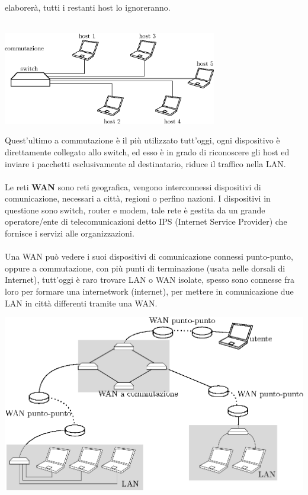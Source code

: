 \documentclass[12pt, letterpaper]{article}
\newcommand{\acc}{\\\hphantom{}\\}
\begin{document}
elaborerà, tutti i restanti host lo ignoreranno.\acc \begin{center}
    \includegraphics[width=0.7\textwidth ]{images/commutazione.eps}
\end{center}
Quest'ultimo a commutazione è il più utilizzato tutt'oggi, ogni dispositivo è direttamente collegato allo switch, ed esso è 
in grado di riconoscere gli host ed inviare i pacchetti esclusivamente al destinatario, riduce il traffico nella LAN.\acc 
Le reti \textbf{WAN} sono reti geografica, vengono interconnessi dispositivi di comunicazione, necessari a città, regioni o 
perfino nazioni. I dispositivi in questione sono switch, router e modem, tale rete è gestita da un grande operatore/ente di 
telecomunicazioni detto IPS (Internet Service Provider) che fornisce i servizi alle organizzazioni.\acc Una WAN può vedere i suoi 
dispositivi di comunicazione connessi punto-punto, oppure a commutazione, con più punti di terminazione (usata nelle dorsali di 
Internet), tutt'oggi è raro trovare LAN o WAN isolate, spesso sono connesse fra loro per formare una internetwork (internet), per 
mettere in comunicazione due LAN in città differenti tramite una WAN.\begin{center}
    \includegraphics[width=1\textwidth ]{images/internetwork.eps}
\end{center}
\end{document}
